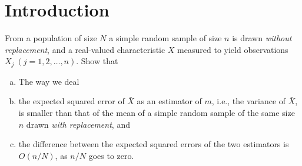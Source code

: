 \chapter{Introduction}
\begin{exer}
	From a population of size $N$ a simple random sample of size $n$ is drawn \textit{without replacement}, and a real-valued characteristic $X$ measured to yield observations $X_j~(j=1,2,\ldots,n)$. Show that
	\begin{enumerate}[(a)]
		\item 
		The way we deal
		\item the expected squared error of $\bar{X}$ as an estimator of $m$, i.e., the variance of $\bar{X}$, is smaller than that of the mean of a simple random sample of the same size $n$ drawn \textit{with replacement}, and
		\item the difference between the expected squared errors of the two estimators is $O(n/N)$, as $n/N$ goes to zero.
	\end{enumerate}
\end{exer}
